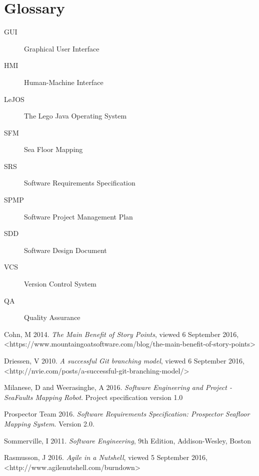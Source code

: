 \documentclass[12pt]{article}
\begin{document}
\section{Glossary}\label{glossary}

\begin{description}
\item [{GUI}] Graphical User Interface 
\item [{HMI}] Human-Machine Interface 
\item [{LeJOS}] The Lego Java Operating System 
\item [{SFM}] Sea Floor Mapping 
\item [{SRS}] Software Requirements Specification 
\item [{SPMP}] Software Project Management Plan
\item [{SDD}] Software Design Document 
\item [{VCS}] Version Control System 
\item[{QA}] Quality Assurance


\end{description}



\begin{thebibliography}{1}

 Cohn, M 2014. \textit{The Main Benefit of Story Points}, viewed 6 September 2016, <https://www.mountaingoatsoftware.com/blog/the-main-benefit-of-story-points>
      
 Driessen, V 2010. \textit{A successful Git branching model}, viewed 6 September 2016, <http://nvie.com/posts/a-successful-git-branching-model/>

 Milanese, D and Weerasinghe, A 2016. \textit{Software Engineering and Project - SeaFaults Mapping Robot}. Project specification version 1.0

 Prospector Team 2016. \textit{Software Requirements Specification: Prospector Seafloor Mapping System}. Version 2.0.
  
 Sommerville, I 2011. \textit{Software Engineering}, 9th Edition, Addison-Wesley, Boston
   
 Rasmusson, J 2016. \textit{Agile in a Nutshell}, viewed 5 September 2016, <http://www.agilenutshell.com/burndown>
   

      
      

  \end{thebibliography}
\end{document}
